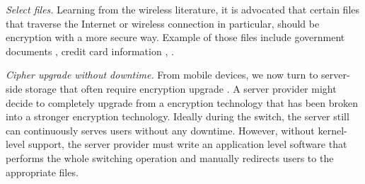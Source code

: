 {\em Select files.}  Learning from the wireless literature, it is
advocated that certain files that traverse the Internet or wireless
connection in particular, should be encryption with a more secure way.
Example of those files include government documents
\cite{citation-to-this-example}, credit card information \cite{a}, \xxx
\cite{a, b, c}.


{\em Cipher upgrade without downtime.}  From mobile devices, we now turn
to server-side storage that often require encryption upgrade
\cite{some-citations}.  A server provider might decide to completely
upgrade from a encryption technology that has been broken into a stronger
encryption technology.  Ideally during the switch, the server still can
continuously serves users without any downtime.  However, without
kernel-level support, the server provider must write an application level
software that performs the whole switching operation and manually
redirects users to the appropriate files.

